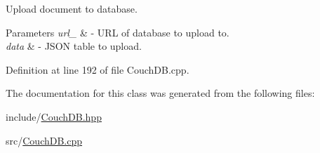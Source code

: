 Upload document to database. 


\begin{DoxyParams}{Parameters}
{\em url\+\_\+} & -\/ U\+RL of database to upload to. \\
\hline
{\em data} & -\/ J\+S\+ON table to upload. \\
\hline
\end{DoxyParams}


Definition at line 192 of file Couch\+D\+B.\+cpp.



The documentation for this class was generated from the following files\+:\begin{DoxyCompactItemize}
\item 
include/\hyperlink{_couch_d_b_8hpp}{Couch\+D\+B.\+hpp}\item 
src/\hyperlink{_couch_d_b_8cpp}{Couch\+D\+B.\+cpp}\end{DoxyCompactItemize}
